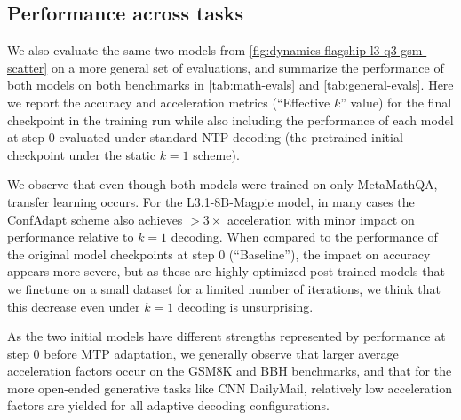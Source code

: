 \documentclass{article}
\theoremstyle{plain}
\theoremstyle{definition}
\theoremstyle{remark}
\begin{document}
\clearpage

\subsection{Performance across tasks}
We also evaluate the same two models from \cref{fig:dynamics-flagship-l3-q3-gsm-scatter} on a more general set of evaluations, and summarize the performance of both models on both benchmarks in \cref{tab:math-evals} and \cref{tab:general-evals}.
Here we report the accuracy and acceleration metrics (``Effective $k$'' value) for the final checkpoint in the training run while also including the performance of each model at step 0 evaluated under standard NTP decoding (the pretrained initial checkpoint under the static $k=1$ scheme). 

We observe that even though both models were trained on only MetaMathQA, transfer learning occurs. For the L3.1-8B-Magpie model, in many cases the ConfAdapt scheme also achieves $>3\times$ acceleration with minor impact on performance relative to $k=1$ decoding. When compared to the performance of the original model checkpoints at step 0 (``Baseline''), the impact on accuracy appears more severe, but as these are highly optimized post-trained models that we finetune on a small dataset for a limited number of iterations, we think that this decrease even under $k=1$ decoding is unsurprising. 

As the two initial models have different strengths represented by performance at step 0 before MTP adaptation, we generally observe that larger average acceleration factors occur on the GSM8K and BBH benchmarks, and that for the more open-ended generative tasks like CNN DailyMail, relatively low acceleration factors are yielded for all adaptive decoding configurations.
\end{document}
